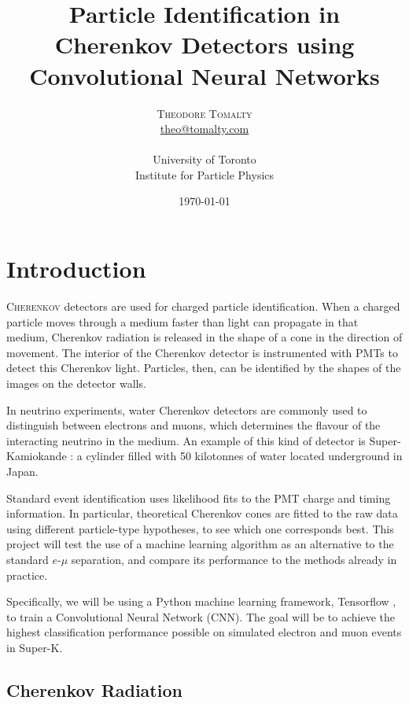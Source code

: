\documentclass[twoside,twocolumn]{article}
\title{Particle Identification in Cherenkov Detectors using Convolutional Neural Networks} %
\author{%
\textsc{Theodore Tomalty} \\[1ex] %
\normalsize \href{mailto:theo@tomalty.com}{theo@tomalty.com}\\~\\ %
\normalsize University of Toronto \\ %
\normalsize Institute for Particle Physics \\
}
\date{\today} %
\begin{document}
\maketitle
\thispagestyle{fancy}


\section{Introduction}

\lettrine[nindent=0em,lines=3]{C}{herenkov} detectors are used for charged particle identification. When a charged particle moves through a medium faster than light can propagate in that medium, Cherenkov radiation is released in the shape of a cone in the direction of movement. The interior of the Cherenkov detector is instrumented with PMTs to detect this Cherenkov light. Particles, then, can be identified by the shapes of the images on the detector walls.

In neutrino experiments, water Cherenkov detectors are commonly used to distinguish between electrons and muons, which determines the flavour of the interacting neutrino in the medium. An example of this kind of detector is Super-Kamiokande  \cite{cite:SuperK}: a cylinder filled with 50 kilotonnes of water located underground in Japan.

Standard event identification uses likelihood fits to the PMT charge and timing information. In particular, theoretical Cherenkov cones are fitted to the raw data using different particle-type hypotheses, to see which one corresponds best. This project will test the use of a machine learning algorithm as an alternative to the standard $e$-$\mu$ separation, and compare its performance to the methods already in practice.

Specifically, we will be using a Python machine learning framework, Tensorflow \cite{cite:tensorflow}, to train a Convolutional Neural Network (CNN). The goal will be to achieve the highest classification performance possible on simulated electron and muon events in Super-K.

\subsection{Cherenkov Radiation}
\end{document}
